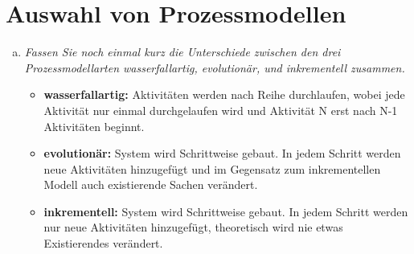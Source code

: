 

\newcommand{\dozent}{Lutz Prechelt}
\newcommand{\tutor}{Samuel Domiks}
\newcommand{\tutoriumNo}{02\\Materialien: Latex, Skript}
\newcommand{\ubungNo}{12}
\newcommand{\veranstaltung}{Softwaretechnik}
\newcommand{\semester}{SoSe21}
\newcommand{\studenten}{Jonny Lam \& Thore Brehmer}




\section{Auswahl von Prozessmodellen}
\begin{enumerate}[(a)]
    \item {\itshape Fassen Sie noch einmal kurz die Unterschiede zwischen den drei Prozessmodellarten
wasserfallartig, evolutionär, und inkrementell zusammen.}
    \begin{itemize}
        \item \textbf{wasserfallartig:} Aktivitäten werden nach Reihe durchlaufen, wobei jede Aktivität nur einmal durchgelaufen wird und Aktivität N erst nach N-1 Aktivitäten beginnt.
        \item \textbf{evolutionär:} System wird Schrittweise gebaut. In jedem Schritt werden neue Aktivitäten hinzugefügt und im Gegensatz zum inkrementellen Modell auch existierende Sachen verändert.
        \item \textbf{inkrementell:} System wird Schrittweise gebaut. In jedem Schritt werden nur neue Aktivitäten hinzugefügt, theoretisch wird nie etwas Existierendes verändert.
    \end{itemize}




\end{enumerate}
